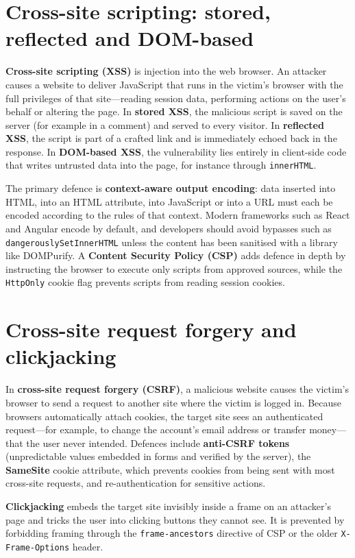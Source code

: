 \section{Cross-site scripting: stored, reflected and DOM-based}\label{sec:9.3}
\textbf{Cross-site scripting (XSS)} is injection into the web browser. An attacker causes a website to deliver JavaScript that runs in the victim's browser with the full privileges of that site—reading session data, performing actions on the user's behalf or altering the page. In \textbf{stored XSS}, the malicious script is saved on the server (for example in a comment) and served to every visitor. In \textbf{reflected XSS}, the script is part of a crafted link and is immediately echoed back in the response. In \textbf{DOM-based XSS}, the vulnerability lies entirely in client-side code that writes untrusted data into the page, for instance through \texttt{innerHTML}.

The primary defence is \textbf{context-aware output encoding}: data inserted into HTML, into an HTML attribute, into JavaScript or into a URL must each be encoded according to the rules of that context. Modern frameworks such as React and Angular encode by default, and developers should avoid bypasses such as \texttt{dangerouslySetInnerHTML} unless the content has been sanitised with a library like DOMPurify. A \textbf{Content Security Policy (CSP)} adds defence in depth by instructing the browser to execute only scripts from approved sources, while the \texttt{HttpOnly} cookie flag prevents scripts from reading session cookies.

\section{Cross-site request forgery and clickjacking}\label{sec:9.4}
In \textbf{cross-site request forgery (CSRF)}, a malicious website causes the victim's browser to send a request to another site where the victim is logged in. Because browsers automatically attach cookies, the target site sees an authenticated request—for example, to change the account's email address or transfer money—that the user never intended. Defences include \textbf{anti-CSRF tokens} (unpredictable values embedded in forms and verified by the server), the \textbf{SameSite} cookie attribute, which prevents cookies from being sent with most cross-site requests, and re-authentication for sensitive actions.

\textbf{Clickjacking} embeds the target site invisibly inside a frame on an attacker's page and tricks the user into clicking buttons they cannot see. It is prevented by forbidding framing through the \texttt{frame-ancestors} directive of CSP or the older \texttt{X-Frame-Options} header.

